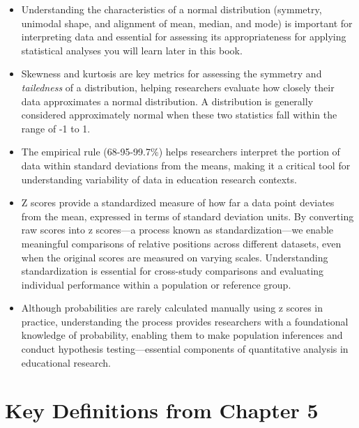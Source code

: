 \documentclass[
  letterpaper,
  DIV=11,
  numbers=noendperiod]{scrreprt}
\begin{document}

\begin{itemize}
\item
  Understanding the characteristics of a normal distribution (symmetry,
  unimodal shape, and alignment of mean, median, and mode) is important
  for interpreting data and essential for assessing its appropriateness
  for applying statistical analyses you will learn later in this book.
\item
  Skewness and kurtosis are key metrics for assessing the symmetry and
  \emph{tailedness} of a distribution, helping researchers evaluate how
  closely their data approximates a normal distribution. A distribution
  is generally considered approximately normal when these two statistics
  fall within the range of -1 to 1.
\item
  The empirical rule (68-95-99.7\%) helps researchers interpret the
  portion of data within standard deviations from the means, making it a
  critical tool for understanding variability of data in education
  research contexts.
\item
  Z scores provide a standardized measure of how far a data point
  deviates from the mean, expressed in terms of standard deviation
  units. By converting raw scores into z scores---a process known as
  standardization---we enable meaningful comparisons of relative
  positions across different datasets, even when the original scores are
  measured on varying scales. Understanding standardization is essential
  for cross-study comparisons and evaluating individual performance
  within a population or reference group.
\item
  Although probabilities are rarely calculated manually using z scores
  in practice, understanding the process provides researchers with a
  foundational knowledge of probability, enabling them to make
  population inferences and conduct hypothesis testing---essential
  components of quantitative analysis in educational research. \,
\end{itemize}

\section*{Key Definitions from Chapter
5}\label{key-definitions-from-chapter-5}

\end{document}
